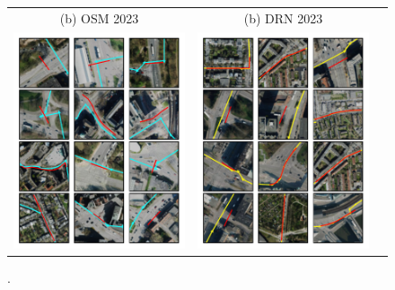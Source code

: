 \begin{figure}[htbp]
\centering 
\begin{tabular}{ccc}
\footnotesize{(b) OSM 2023} & \footnotesize{(b) DRN 2023}  \\
\includegraphics[width=0.46\linewidth]{images/routing-lane-alignment-examples-osm.pdf} & \includegraphics[width=0.46\linewidth]{images/routing-lane-alignment-examples-drn.pdf} \\
\end{tabular}
\caption{.}
\label{fig:}
\end{figure}

